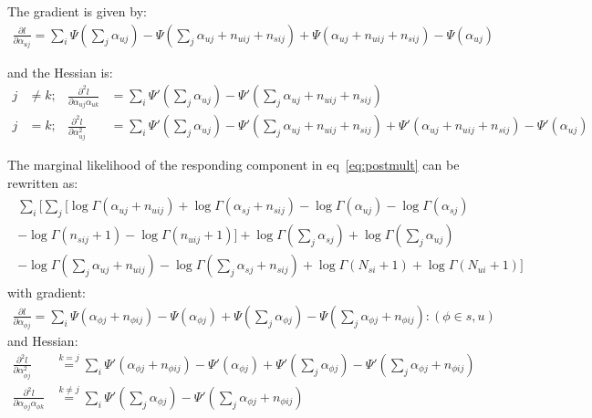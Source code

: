 \documentclass[11pt]{article}
\begin{document}
The gradient is given by:
\begin{align}
\frac{\partial l}{ \partial \alpha_{uj}} = \sum_i \Psi(\sum_j \alpha_{uj}) - \Psi (\sum_j \alpha_{uj}+n_{uij}+n_{sij}) + \Psi(\alpha_{uj}+n_{uij}+n_{sij}) - \Psi(\alpha_{uj})\label{mdgrad}
\end{align}

and the Hessian is:
\begin{align}
j&\ne k; &\frac{\partial^2 l}{\partial \alpha_{uj}\alpha_{uk}} & = \sum_i \Psi'(\sum_j\alpha_{uj})-\Psi'(\sum_j\alpha_{uj}+n_{uij}+n_{sij})\\
j&=k;&\frac{\partial^2l}{\partial \alpha_{uj}^2} &= \sum_i \Psi'(\sum_j\alpha_{uj})-\Psi'(\sum_j\alpha_{uj}+n_{uij}+n_{sij})+\Psi'(\alpha_{uj}+n_{uij}+n_{sij})-\Psi'(\alpha_{uj})
\end{align}

The marginal likelihood of the responding component in eq~\ref{eq:postmult} can be rewritten as:
\begin{align}
\begin{split}
\sum_i\bigg[\sum_j \big[ \log\Gamma(\alpha_{uj}+n_{uij})+\log\Gamma(\alpha_{sj}+n_{sij}) -\log\Gamma(\alpha_{uj}) -\log\Gamma(\alpha_{sj})\\
-\log\Gamma(n_{sij}+1)-\log\Gamma(n_{uij}+1)\big]+\log\Gamma(\sum_j\alpha_{sj})+\log\Gamma(\sum_j\alpha_{uj})\\
-\log\Gamma(\sum_j\alpha_{uj}+n_{uij})-\log\Gamma(\sum_j\alpha_{sj}+n_{sij})+\log\Gamma(N_{si}+1)+\log\Gamma(N_{ui}+1)\bigg]
\end{split}
\end{align}
with gradient:
\begin{align}
\frac{\partial l}{\partial\alpha_{\phi j}} = \sum_i \Psi(\alpha_{\phi j}+n_{\phi ij})-\Psi(\alpha_{\phi j})+\Psi(\sum_j \alpha_{\phi j}) - \Psi(\sum_j \alpha_{\phi j}+n_{\phi ij}): (\phi \in {s,u})
\end{align}
and Hessian:
\begin{align}
\frac{\partial^2l}{\partial \alpha_{\phi j}^2}& \overset {k=j}{=}\sum_i \Psi'(\alpha_{\phi j}+n_{\phi ij}) - \Psi'(\alpha_{\phi j}) + \Psi'(\sum_j \alpha_{\phi j}) - \Psi'(\sum_j\alpha_{\phi j}+n_{\phi ij})\\
\frac{\partial^2l}{\partial \alpha_{\phi j}\alpha_{\phi k}}&\overset{k\ne j}{=}\sum_i\Psi'(\sum_j \alpha_{\phi j}) - \Psi'(\sum_j\alpha_{\phi j}+n_{\phi ij})
\end{align}
\end{document}
